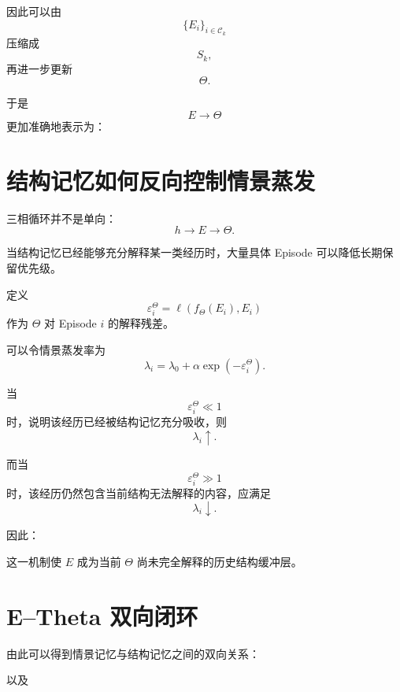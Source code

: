 因此可以由
\[
\{E_i\}_{i\in\mathcal C_k}
\]
压缩成
\[
S_k,
\]
再进一步更新
\[
\Theta.
\]

于是
\[
\boxed{
E\rightarrow\Theta
}
\]
更加准确地表示为：
\begin{statementbox}
\centering
{}
\end{statementbox}

\section{结构记忆如何反向控制情景蒸发}

三相循环并不是单向：
\[
h\rightarrow E\rightarrow\Theta.
\]

当结构记忆已经能够充分解释某一类经历时，大量具体 Episode 可以降低长期保留优先级。

定义
\[
\varepsilon_i^\Theta
=
\ell
\left(
f_\Theta(E_i),
E_i
\right)
\]
作为 $\Theta$ 对 Episode $i$ 的解释残差。

可以令情景蒸发率为
\[
\boxed{
\lambda_i
=
\lambda_0
+
\alpha
\exp
\left(
-\varepsilon_i^\Theta
\right).
}
\]

当
\[
\varepsilon_i^\Theta\ll1
\]
时，说明该经历已经被结构记忆充分吸收，则
\[
\lambda_i\uparrow.
\]

而当
\[
\varepsilon_i^\Theta\gg1
\]
时，该经历仍然包含当前结构无法解释的内容，应满足
\[
\lambda_i\downarrow.
\]

因此：
\begin{statementbox}
\centering
{}
\end{statementbox}

这一机制使 $E$ 成为当前 $\Theta$ 尚未完全解释的历史结构缓冲层。

\section{E--Theta 双向闭环}

由此可以得到情景记忆与结构记忆之间的双向关系：
\begin{statementbox}
\centering
{}
\end{statementbox}
以及
\begin{statementbox}
\centering
{}
\end{statementbox}

